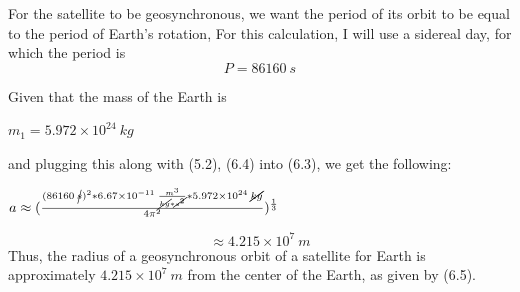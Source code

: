 \documentclass{article}
\begin{document}
For the satellite to be geosynchronous, we want the period of its orbit to be equal to the period of Earth's rotation, For this calculation, I will use a sidereal day, for which the period is 
\begin{equation}
    P = 86160\:s
\end{equation}


Given that the mass of the Earth is
\\[20pt]
\begin{center}
    $m_1 = 5.972\times10^{24}\:kg$
\end{center}
and plugging this along with (5.2), (6.4) into (6.3), we get the following:
\begin{center}
    $a \approx (\frac{(86160\:\cancel{s})^2*6.67\times10^{-11}\:\frac{m^3}{\cancel{kg}*\cancel{s^2}}*5.972\times10^{24}\:\cancel{kg}}{4\pi^2})^{\frac{1}{3}}$
\end{center}
\begin{equation}
    \approx 4.215\times10^7\:m
\end{equation}
Thus, the radius of a geosynchronous orbit of a satellite for Earth is approximately $4.215\times10^7\: m$ from the center of the Earth, as given by (6.5).
\end{document}
